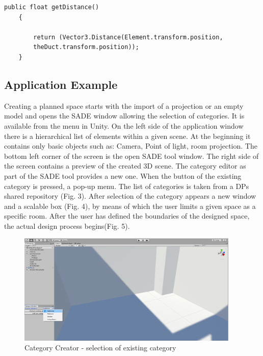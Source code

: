 \documentclass[runningheads]{llncs}
\begin{document}
\begin{lstlisting}[language={[Sharp]C}, caption={C\# exaple}, label={Script}]
public float getDistance()
    {

        return (Vector3.Distance(Element.transform.position, 
        theDuct.transform.position));
    }
\end{lstlisting}

\subsection{Application Example}
Creating a planned space starts with the import of a projection or an empty model and opens the SADE window allowing the selection of categories. It is available from the menu in Unity. On the left side of the application window there is a hierarchical list of elements within a given scene. At the beginning it contains only basic objects such as: Camera, Point of light, room projection. The bottom left corner of the screen is the open SADE tool window. The right side of the screen contains a preview of the created 3D scene. The category editor as part of the SADE tool provides a new one. When the button of the existing category is pressed, a pop-up menu. The list of categories is taken from a DPs shared repository (Fig. 3). After selection of the category appears a new window and a scalable box (Fig. 4), by means of which the user limits a given space as a specific room. After the user has defined the boundaries of the designed space, the actual design process begins(Fig. 5).

\begin{figure}[H]
\centering
\includegraphics[width=\textwidth, height=5.3cm]{editor1.png}
\caption{Category Creator - selection of existing category} \label{fig3}
\end{figure}
\end{document}

